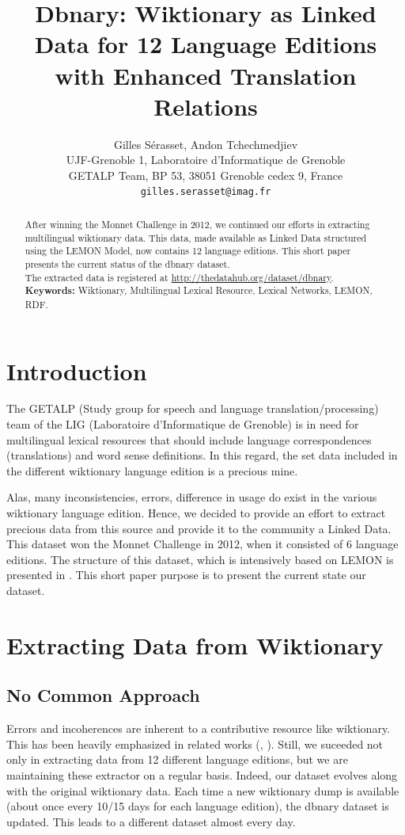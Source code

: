 \documentclass[10pt, a4paper]{article}
\title{Dbnary: Wiktionary as Linked Data for 12 Language Editions with Enhanced Translation Relations}
\author{Gilles Sérasset, Andon Tchechmedjiev\\
UJF-Grenoble 1, Laboratoire d'Informatique de Grenoble\\ 
GETALP Team, BP 53, 38051 Grenoble cedex 9, France \\ 
\texttt{gilles.serasset@imag.fr}
\\}
\date{}
\begin{document}
\maketitle

\begin{abstract}
After winning the Monnet Challenge in 2012, we continued our efforts in extracting multilingual wiktionary data. This data, made available as Linked Data structured using the LEMON Model, now contains 12 language editions. This short paper presents the current status of the dbnary dataset.\\
The extracted data is registered at \url{http://thedatahub.org/dataset/dbnary}.\\
\textbf{Keywords:} Wiktionary, Multilingual Lexical Resource, Lexical Networks, LEMON, RDF.
\end{abstract}


\section{Introduction}

The GETALP (Study group for speech and language translation/processing) team of the LIG (Laboratoire d'Informatique de Grenoble) is in need for multilingual lexical resources that should include language correspondences (translations) and word sense definitions. In this regard, the set data included in the different wiktionary language edition is a precious mine.

Alas, many inconsistencies, errors, difference in usage do exist in the various wiktionary language edition. Hence, we decided to provide an effort to extract precious data from this source and provide it to the community a Linked Data. This dataset won the Monnet Challenge in 2012, when it consisted of 6 language editions. The structure of this dataset, which is intensively based on LEMON is presented in \cite{serasset:dbnary-swj}. This short paper purpose is to present the current state our dataset.

\section{Extracting Data from Wiktionary}

\subsection{No Common Approach}

Errors and incoherences are inherent to a contributive resource like wiktionary. This has been heavily emphasized in related works (\cite{HellmannSebastianandBrekleJonasandAuer}, \cite{TUD-CS-2012-0008}). Still, we suceeded not only in extracting data from 12 different language editions, but we are maintaining these extractor on a regular basis. Indeed, our dataset evolves along with the original wiktionary data. Each time a new wiktionary dump is available (about once every 10/15 days for each language edition), the dbnary dataset is updated. This leads to a different dataset almost every day.
\end{document}
